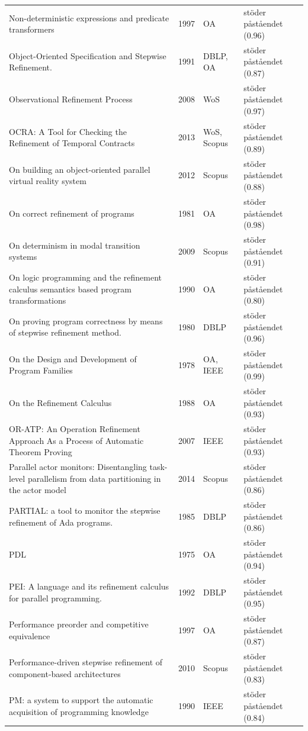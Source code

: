 \begin{longtable}{@{}%
  >{\raggedright\arraybackslash}p{}c%
  >{\raggedright\arraybackslash}p{}%
  >{\raggedright\arraybackslash}p{}@{}}
Non-deterministic expressions and predicate transformers & 1997 & OA & stöder påståendet (0.96) \\
Object-Oriented Specification and Stepwise Refinement. & 1991 & DBLP, OA & stöder påståendet (0.87) \\
Observational Refinement Process & 2008 & WoS & stöder påståendet (0.97) \\
OCRA: A Tool for Checking the Refinement of Temporal Contracts & 2013 & WoS, Scopus & stöder påståendet (0.89) \\
On building an object-oriented parallel virtual reality system & 2012 & Scopus & stöder påståendet (0.88) \\
On correct refinement of programs & 1981 & OA & stöder påståendet (0.98) \\
On determinism in modal transition systems & 2009 & Scopus & stöder påståendet (0.91) \\
On logic programming and the refinement calculus semantics based program transformations & 1990 & OA & stöder påståendet (0.80) \\
On proving program correctness by means of stepwise refinement method. & 1980 & DBLP & stöder påståendet (0.96) \\
On the Design and Development of Program Families & 1978 & OA, IEEE & stöder påståendet (0.99) \\
On the Refinement Calculus & 1988 & OA & stöder påståendet (0.93) \\
OR-ATP: An Operation Refinement Approach As a Process of Automatic Theorem Proving & 2007 & IEEE & stöder påståendet (0.93) \\
Parallel actor monitors: Disentangling task-level parallelism from data partitioning in the actor model & 2014 & Scopus & stöder påståendet (0.86) \\
PARTIAL: a tool to monitor the stepwise refinement of Ada programs. & 1985 & DBLP & stöder påståendet (0.86) \\
PDL & 1975 & OA & stöder påståendet (0.94) \\
PEI: A language and its refinement calculus for parallel programming. & 1992 & DBLP & stöder påståendet (0.95) \\
Performance preorder and competitive equivalence & 1997 & OA & stöder påståendet (0.87) \\
Performance-driven stepwise refinement of component-based architectures & 2010 & Scopus & stöder påståendet (0.83) \\
PM: a system to support the automatic acquisition of programming knowledge & 1990 & IEEE & stöder påståendet (0.84) \\

\end{longtable}
